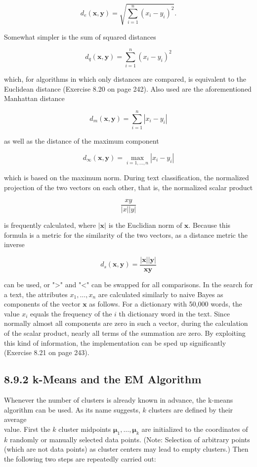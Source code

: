 \documentclass[10pt]{article}
\begin{document}
$$
d_{e}(\boldsymbol{x}, \boldsymbol{y})=\sqrt{\sum_{i=1}^{n}\left(x_{i}-y_{i}\right)^{2}} .
$$

Somewhat simpler is the sum of squared distances

$$
d_{q}(\boldsymbol{x}, \boldsymbol{y})=\sum_{i=1}^{n}\left(x_{i}-y_{i}\right)^{2}
$$

which, for algorithms in which only distances are compared, is equivalent to the Euclidean distance (Exercise 8.20 on page 242). Also used are the aforementioned Manhattan distance

$$
d_{m}(\boldsymbol{x}, \boldsymbol{y})=\sum_{i=1}^{n}\left|x_{i}-y_{i}\right|
$$

as well as the distance of the maximum component

$$
d_{\infty}(\boldsymbol{x}, \boldsymbol{y})=\max _{i=1, \ldots, n}\left|x_{i}-y_{i}\right|
$$

which is based on the maximum norm. During text classification, the normalized projection of the two vectors on each other, that is, the normalized scalar product

$$
\frac{x y}{|x||y|}
$$

is frequently calculated, where $|\boldsymbol{x}|$ is the Euclidian norm of $\boldsymbol{x}$. Because this formula is a metric for the similarity of the two vectors, as a distance metric the inverse

$$
d_{s}(\boldsymbol{x}, \boldsymbol{y})=\frac{|\boldsymbol{x}||\boldsymbol{y}|}{\boldsymbol{x} \boldsymbol{y}}
$$

can be used, or ">" and "<" can be swapped for all comparisons. In the search for a text, the attributes $x_{1}, \ldots, x_{n}$ are calculated similarly to naive Bayes as components of the vector $\boldsymbol{x}$ as follows. For a dictionary with 50,000 words, the value $x_{i}$ equals the frequency of the $i$ th dictionary word in the text. Since normally almost all components are zero in such a vector, during the calculation of the scalar product, nearly all terms of the summation are zero. By exploiting this kind of information, the implementation can be sped up significantly (Exercise 8.21 on page 243).

\subsection*{8.9.2 k-Means and the EM Algorithm}
Whenever the number of clusters is already known in advance, the k-means algorithm can be used. As its name suggests, $k$ clusters are defined by their average\\
value. First the $k$ cluster midpoints $\boldsymbol{\mu}_{1}, \ldots, \boldsymbol{\mu}_{k}$ are initialized to the coordinates 
of $k$ randomly or manually selected data points. (Note: Selection of arbitrary points (which are not data points) as cluster centers may lead to empty clusters.) Then the following two steps are repeatedly carried out:
\end{document}
